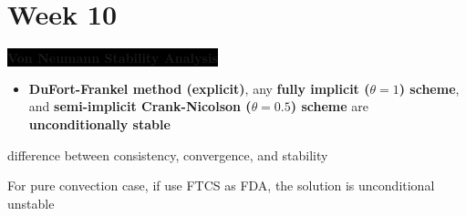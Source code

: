\section{Week 10}

\colorbox{black}{\textbf{\color{white}Von Neumann Stability Analysis}}

\begin{itemize}
    \item \textbf{\color{teal}DuFort-Frankel method (explicit)}, any \textbf{\color{blue}fully implicit ($\theta = 1$) scheme}, and \textbf{\color{orange}semi-implicit Crank-Nicolson ($\theta = 0.5$) scheme} are \textbf{\color{red}unconditionally stable} 
\end{itemize}

difference between consistency, convergence, and stability

For pure convection case, if use FTCS as FDA, the solution is unconditional unstable